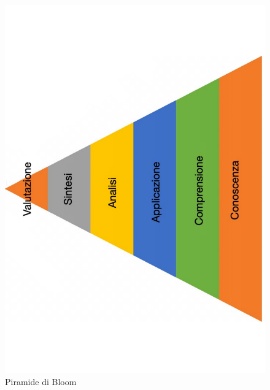 \begin{figure}[h!]
  \centerline{\includegraphics[height = 9 cm, width= 6 cm, angle=270]{figures/bloom.pdf}}
  \caption{Piramide di Bloom}
\end{figure}
